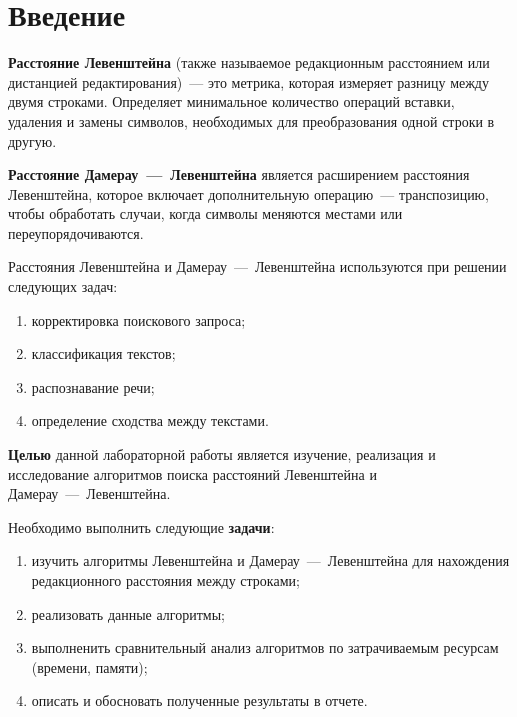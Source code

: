 \chapter*{Введение}

\textbf{Расстояние Левенштейна} (также называемое редакционным расстоянием или дистанцией редактирования)~--- это метрика, которая измеряет разницу между двумя строками.
Определяет минимальное количество операций вставки, удаления и замены символов, необходимых для преобразования одной строки в другую.

\textbf{Расстояние Дамерау~---~Левенштейна} является расширением расстояния Левенштейна, которое включает дополнительную операцию~--- транспозицию, чтобы обработать случаи, когда символы меняются местами или переупорядочиваются.

Расстояния Левенштейна и Дамерау~---~Левенштейна используются при решении следующих задач:
\begin{enumerate}
    \item корректировка поискового запроса;
    \item классификация текстов;
    \item распознавание речи;
    \item определение сходства между текстами.
\end{enumerate}

\textbf{Целью} данной лабораторной работы является изучение, реализация и исследование алгоритмов поиска расстояний Левенштейна и Дамерау~---~Левенштейна.

Необходимо выполнить следующие \textbf{задачи}:
\begin{enumerate}[]
    \item изучить алгоритмы Левенштейна и Дамерау~---~Левенштейна для нахождения редакционного расстояния между строками;
    \item реализовать данные алгоритмы;
    \item выполненить сравнительный анализ алгоритмов по затрачиваемым ресурсам (времени, памяти);
    \item описать и обосновать полученные результаты в отчете.
\end{enumerate}